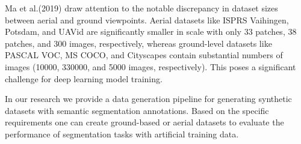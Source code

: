 \documentclass[../report.tex]{subfiles}
\begin{document}
    Ma et al.(2019)\cite{ma2019deep} draw attention to the notable discrepancy in dataset sizes between aerial and ground viewpoints. Aerial datasets like ISPRS Vaihingen, Potsdam\cite{markus2014use}, and UAVid\cite{lyu2020uavid} are significantly smaller in scale with only 33 patches, 38 patches, and 300 images, respectively, whereas ground-level datasets like PASCAL VOC\cite{everingham2010pascal}, MS COCO\cite{lin2014microsoft}, and Cityscapes\cite{cordts2016cityscapes} contain substantial numbers of images (10000, 330000, and 5000 images, respectively). This poses a significant challenge for deep learning model training.

    In our research we provide a data generation pipeline for generating synthetic datasets with semantic segmentation annotations. Based on the specific requirements one can create ground-based or aerial datasets to evaluate the performance of segmentation tasks with artificial training data. 
\end{document}
